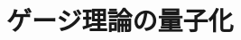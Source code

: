\documentclass[unicode,a4paper,10pt]{ltjsarticle}
\begin{document}
\clearpage
\section{ゲージ理論の量子化}














\clearpage



\nocite{Peskin:1995}

\end{document}
